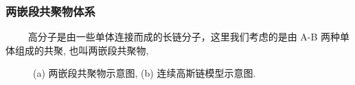 \documentclass[notheorems,serif]{beamer}
\begin{document}
\begin{frame}
    \frametitle{两嵌段共聚物体系}
~~~~ 高分子是由一些单体连接而成的长链分子，这里我们考虑的是由 A-B 两种单体组成的共聚, 也叫两嵌段共聚物,    
\begin{figure}[H]
\centering
{}
\caption{(a) 两嵌段共聚物示意图, (b) 连续高斯链模型示意图.}
\end{figure}
\end{frame}
\end{document}
